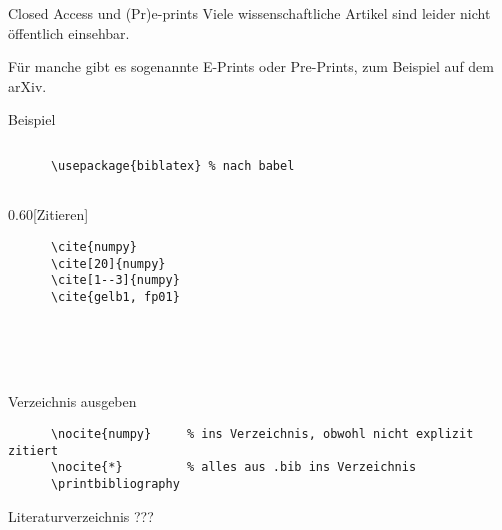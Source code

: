 \begin{frame}[fragile]{Closed Access und (Pr)e-prints}
  Viele wissenschaftliche Artikel sind leider nicht öffentlich einsehbar.

  Für manche gibt es sogenannte E-Prints oder Pre-Prints, zum Beispiel auf dem arXiv.

  \begin{block}{Beispiel}
    \footnotesize
    \inputminted[firstline=88, lastline=107]{bibtex}{examples.bib}
  \end{block}

\end{frame}

\begin{frame}[fragile]{%
  \BibLaTeX{}%
  \hfill%
}
  \begin{Packages}
    \begin{verbatim}
      \usepackage{biblatex} % nach babel
      
    \end{verbatim}
  \end{Packages}
  \begin{CodeExample}{0.60}[Zitieren]
    \begin{verbatim}
      \cite{numpy}
      \cite[20]{numpy}
      \cite[1--3]{numpy}
      \cite{gelb1, fp01}
    \end{verbatim}
  \CodeResult
    \cite{numpy} \\
    \cite[20]{numpy} \\
    \cite[1--3]{numpy} \\
    \cite{gelb1, fp01}
  \end{CodeExample}
  \begin{block}{Verzeichnis ausgeben}
    \begin{verbatim}
      \nocite{numpy}     % ins Verzeichnis, obwohl nicht explizit zitiert
      \nocite{*}         % alles aus .bib ins Verzeichnis
      \printbibliography
    \end{verbatim}
  \end{block}
\end{frame}

\begin{frame}{Literaturverzeichnis}
  \centering
  \pause
  \Huge ???
\end{frame}

